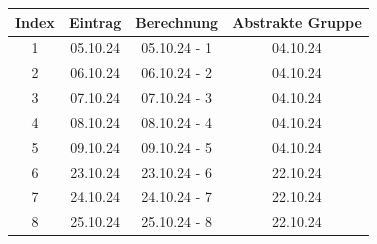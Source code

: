\begin{tabular}{cccc}
\rowcolor{heading}Index & Eintrag & Berechnung & Abstrakte Gruppe \\
\hline
1 & 05.10.24 & 05.10.24 - 1 & 04.10.24 \\
\rowcolor{odd}2 & 06.10.24 & 06.10.24 - 2 & 04.10.24 \\
3 & 07.10.24 & 07.10.24 - 3 & 04.10.24 \\
\rowcolor{odd}4 & 08.10.24 & 08.10.24 - 4 & 04.10.24 \\
5 & 09.10.24 & 09.10.24 - 5 & 04.10.24 \\
\rowcolor{odd}6 & 23.10.24 & 23.10.24 - 6 & 22.10.24 \\
7 & 24.10.24 & 24.10.24 - 7 & 22.10.24 \\
\rowcolor{odd}8 & 25.10.24 & 25.10.24 - 8 & 22.10.24 \\
\end{tabular}